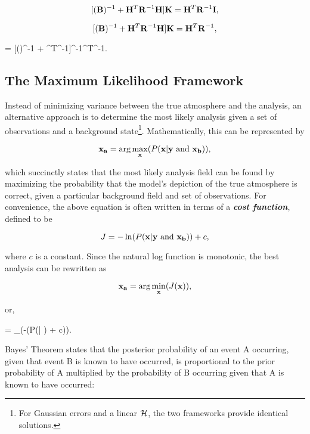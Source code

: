 $$
    [(\mathbf{B})^{-1} + \mathbf{H}^T\mathbf{R}^{-1}\mathbf{H}]\mathbf{K} = \mathbf{H}^T\mathbf{R}^{-1}\mathbf{I},
$$


$$
    [(\mathbf{B})^{-1} + \mathbf{H}^T\mathbf{R}^{-1}\mathbf{H}]\mathbf{K} = \mathbf{H}^T\mathbf{R}^{-1},
$$


\be
    \label{alternative kalman gain matrix}
     = [()^{-1} + ^T^{-1}]^{-1}^T^{-1}.
\ee




\subsection{The Maximum Likelihood Framework}
\label{The Maximum Likelihood Framework}

Instead of minimizing variance between the true atmosphere and the analysis, an alternative approach is to determine the most likely analysis given a set of observations and a background state\footnote{For Gaussian errors and a linear $\mathcal{H}$, the two frameworks provide identical solutions.}. Mathematically, this can be represented by


$$
    \mathbf{x_a} = \arg\max_{\mathbf{x}}(P(\mathbf{x}|\mathbf{y} \text{ and } \mathbf{x_b})),
$$


\noindent which succinctly states that the most likely analysis field can be found by maximizing the probability that the model's depiction of the true atmosphere is correct, given a particular background field and set of observations. For convenience, the above equation is often written in terms of a \emph{\textbf{cost function}}, defined to be


$$
    J = -\ln(P(\mathbf{x}|\mathbf{y} \text{ and } \mathbf{x_b})) + c,
$$


\noindent where $c$ is a constant. Since the natural log function is monotonic, the best analysis can be rewritten as


$$
    \mathbf{x_a} = \arg\min_{\mathbf{x}}(J(\mathbf{x})),
$$


\noindent or,


\be
    \label{expanded maximum likelihood equation}
     = \arg\min_{}(-\ln(P(|  ) + c)).
\ee


Bayes' Theorem states that the posterior probability of an event A occurring, given that event B is known to have occurred, is proportional to the prior probability of A multiplied by the probability of B occurring given that A is known to have occurred:


